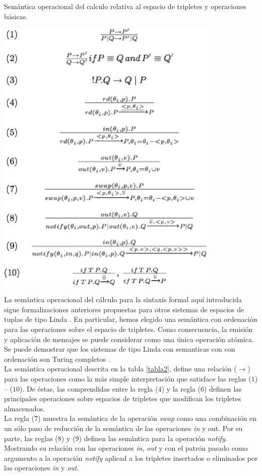 \begin{table}
\vspace{2.4in}
\caption{Sem\'antica operacional del calculo relativa al espacio de tripletes y operaciones b\'asicas.}
\includegraphics[width=0.8\textwidth]{tabla2}
\label{tabla2}
\end{table}

La sem\'antica operacional del c\'alculo para la sintaxis formal aqu\'i introducida sigue formalizaciones anteriores propuestas para otros sistemas de espacios de tuplas de tipo Linda \cite{linda}. En particular, hemos elegido una sem\'antica con ordenaci\'on para las operaciones sobre el espacio de tripletes. Como consecuencia, la emisi\'on y aplicaci\'on de mensajes se puede considerar como una \'unica operaci\'on at\'omica. Se puede demostrar que los sistemas de tipo Linda con semanticas con con ordenaci\'on son Turing completos \cite{busi2000expressiveness}.\\
La sem\'antica operacional descrita en la tabla \ref{tabla2}, define una relaci\'on ($\rightarrow$) para las operaciones como la m\'as simple interpretaci\'on que satisface las reglas ($1$) – ($10$). De \'estas, las comprendidas entre la regla ($4$)  y la regla ($6$) definen las principales operaciones sobre espacios de tripletes que modifican los tripletes almacenados.\\
La regla ($7$) muestra la sem\'antica de la operaci\'on \textit{swap} como una combinaci\'on en un s\'olo paso de reducci\'on de la sem\'antica de las operaciones \textit{in} y out. Por su parte, las reglas ($8$) y ($9$) definen las sem\'antica para la operaci\'on \textit{notify}. Mostrando su relaci\'on con las operaciones \textit{in}, \textit{out} y con el patr\'on pasado como argumento a la operaci\'on \textit{notify} aplicad a los tripletes insertados o eliminados por las operaciones \textit{in} y \textit{out}.\\

